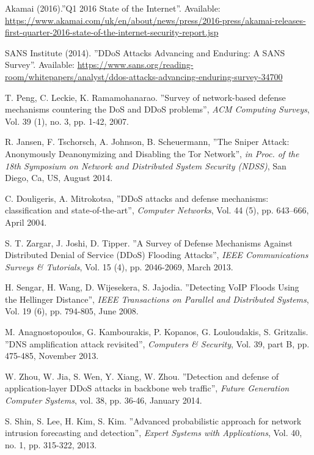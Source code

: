\begin{thebibliography}{11}
Akamai (2016).''Q1 2016 State of the Internet''. Available: \url{https://www.akamai.com/uk/en/about/news/press/2016-press/akamai-releases-first-quarter-2016-state-of-the-internet-security-report.jsp}

SANS Institute (2014). ''DDoS Attacks Advancing and Enduring: A SANS Survey''. Available: \url{https://www.sans.org/reading-room/whitepapers/analyst/ddos-attacks-advancing-enduring-survey-34700}

T. Peng, C. Leckie, K. Ramamohanarao. ''Survey of network-based defense mechanisms countering the DoS and DDoS problems'', \textit{ACM Computing Surveys}, Vol. 39 (1), no. 3, pp. 1-42, 2007.

R. Jansen, F. Tschorsch, A. Johnson, B. Scheuermann, ''The Sniper Attack: Anonymously Deanonymizing and Disabling the Tor Network'', \textit{in Proc. of the 18th Symposium on Network and Distributed System Security (NDSS)}, San Diego, Ca, US, August 2014.

C. Douligeris, A. Mitrokotsa, ''DDoS attacks and defense mechanisms: classification and state-of-the-art'', \textit{Computer Networks}, Vol. 44 (5), pp. 643–666, April 2004.

S. T. Zargar, J. Joshi, D. Tipper. ''A Survey of Defense Mechanisms Against Distributed Denial of Service (DDoS) Flooding Attacks'', \textit{IEEE Communications Surveys \& Tutorials}, Vol. 15 (4), pp. 2046-2069, March 2013.

H. Sengar, H. Wang, D. Wijesekera, S. Jajodia. ''Detecting VoIP Floods Using the Hellinger Distance'', \textit{IEEE Transactions on  Parallel and Distributed Systems}, Vol. 19 (6), pp. 794-805, June 2008.

M. Anagnostopoulos, G. Kambourakis, P. Kopanos, G. Louloudakis, S. Gritzalis. ''DNS amplification attack revisited'', \textit{Computers \& Security}, Vol. 39, part B, pp. 475-485, November 2013.

W. Zhou, W. Jia, S. Wen, Y. Xiang, W. Zhou. ''Detection and defense of application-layer DDoS attacks in backbone web traffic'', \textit{Future Generation Computer Systems}, vol. 38, pp. 36-46, January 2014.

S. Shin, S. Lee, H. Kim, S. Kim. ''Advanced probabilistic approach for network intrusion forecasting and detection'', \textit{Expert Systems with Applications}, Vol. 40, no. 1, pp. 315-322, 2013.


\end{thebibliography}
